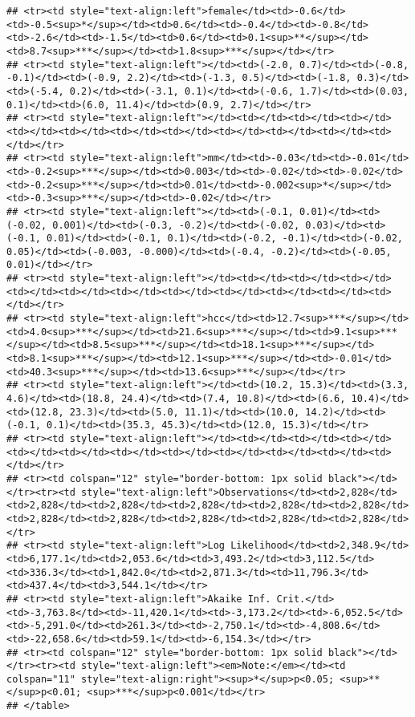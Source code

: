 \documentclass[]{article}
\begin{document}
\begin{verbatim}
## <tr><td style="text-align:left">female</td><td>-0.6</td><td>-0.5<sup>*</sup></td><td>0.6</td><td>-0.4</td><td>-0.8</td><td>-2.6</td><td>-1.5</td><td>0.6</td><td>0.1<sup>**</sup></td><td>8.7<sup>***</sup></td><td>1.8<sup>***</sup></td></tr>
## <tr><td style="text-align:left"></td><td>(-2.0, 0.7)</td><td>(-0.8, -0.1)</td><td>(-0.9, 2.2)</td><td>(-1.3, 0.5)</td><td>(-1.8, 0.3)</td><td>(-5.4, 0.2)</td><td>(-3.1, 0.1)</td><td>(-0.6, 1.7)</td><td>(0.03, 0.1)</td><td>(6.0, 11.4)</td><td>(0.9, 2.7)</td></tr>
## <tr><td style="text-align:left"></td><td></td><td></td><td></td><td></td><td></td><td></td><td></td><td></td><td></td><td></td><td></td></tr>
## <tr><td style="text-align:left">mm</td><td>-0.03</td><td>-0.01</td><td>-0.2<sup>***</sup></td><td>0.003</td><td>-0.02</td><td>-0.02</td><td>-0.2<sup>***</sup></td><td>0.01</td><td>-0.002<sup>*</sup></td><td>-0.3<sup>***</sup></td><td>-0.02</td></tr>
## <tr><td style="text-align:left"></td><td>(-0.1, 0.01)</td><td>(-0.02, 0.001)</td><td>(-0.3, -0.2)</td><td>(-0.02, 0.03)</td><td>(-0.1, 0.01)</td><td>(-0.1, 0.1)</td><td>(-0.2, -0.1)</td><td>(-0.02, 0.05)</td><td>(-0.003, -0.000)</td><td>(-0.4, -0.2)</td><td>(-0.05, 0.01)</td></tr>
## <tr><td style="text-align:left"></td><td></td><td></td><td></td><td></td><td></td><td></td><td></td><td></td><td></td><td></td><td></td></tr>
## <tr><td style="text-align:left">hcc</td><td>12.7<sup>***</sup></td><td>4.0<sup>***</sup></td><td>21.6<sup>***</sup></td><td>9.1<sup>***</sup></td><td>8.5<sup>***</sup></td><td>18.1<sup>***</sup></td><td>8.1<sup>***</sup></td><td>12.1<sup>***</sup></td><td>-0.01</td><td>40.3<sup>***</sup></td><td>13.6<sup>***</sup></td></tr>
## <tr><td style="text-align:left"></td><td>(10.2, 15.3)</td><td>(3.3, 4.6)</td><td>(18.8, 24.4)</td><td>(7.4, 10.8)</td><td>(6.6, 10.4)</td><td>(12.8, 23.3)</td><td>(5.0, 11.1)</td><td>(10.0, 14.2)</td><td>(-0.1, 0.1)</td><td>(35.3, 45.3)</td><td>(12.0, 15.3)</td></tr>
## <tr><td style="text-align:left"></td><td></td><td></td><td></td><td></td><td></td><td></td><td></td><td></td><td></td><td></td><td></td></tr>
## <tr><td colspan="12" style="border-bottom: 1px solid black"></td></tr><tr><td style="text-align:left">Observations</td><td>2,828</td><td>2,828</td><td>2,828</td><td>2,828</td><td>2,828</td><td>2,828</td><td>2,828</td><td>2,828</td><td>2,828</td><td>2,828</td><td>2,828</td></tr>
## <tr><td style="text-align:left">Log Likelihood</td><td>2,348.9</td><td>6,177.1</td><td>2,053.6</td><td>3,493.2</td><td>3,112.5</td><td>336.3</td><td>1,842.0</td><td>2,871.3</td><td>11,796.3</td><td>437.4</td><td>3,544.1</td></tr>
## <tr><td style="text-align:left">Akaike Inf. Crit.</td><td>-3,763.8</td><td>-11,420.1</td><td>-3,173.2</td><td>-6,052.5</td><td>-5,291.0</td><td>261.3</td><td>-2,750.1</td><td>-4,808.6</td><td>-22,658.6</td><td>59.1</td><td>-6,154.3</td></tr>
## <tr><td colspan="12" style="border-bottom: 1px solid black"></td></tr><tr><td style="text-align:left"><em>Note:</em></td><td colspan="11" style="text-align:right"><sup>*</sup>p<0.05; <sup>**</sup>p<0.01; <sup>***</sup>p<0.001</td></tr>
## </table>
\end{verbatim}
\end{document}
